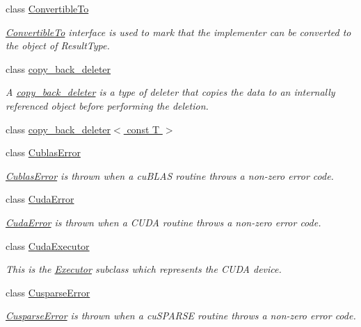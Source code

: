 \begin{DoxyCompactItemize}
class \hyperlink{classgko_1_1ConvertibleTo}{Convertible\+To}
\begin{DoxyCompactList}\small\item\em \hyperlink{classgko_1_1ConvertibleTo}{Convertible\+To} interface is used to mark that the implementer can be converted to the object of Result\+Type. \end{DoxyCompactList}\item 
class \hyperlink{classgko_1_1copy__back__deleter}{copy\+\_\+back\+\_\+deleter}
\begin{DoxyCompactList}\small\item\em A \hyperlink{classgko_1_1copy__back__deleter}{copy\+\_\+back\+\_\+deleter} is a type of deleter that copies the data to an internally referenced object before performing the deletion. \end{DoxyCompactList}\item 
class \hyperlink{classgko_1_1copy__back__deleter_3_01const_01T_01_4}{copy\+\_\+back\+\_\+deleter$<$ const T $>$}
\item 
class \hyperlink{classgko_1_1CublasError}{Cublas\+Error}
\begin{DoxyCompactList}\small\item\em \hyperlink{classgko_1_1CublasError}{Cublas\+Error} is thrown when a cu\+B\+L\+AS routine throws a non-\/zero error code. \end{DoxyCompactList}\item 
class \hyperlink{classgko_1_1CudaError}{Cuda\+Error}
\begin{DoxyCompactList}\small\item\em \hyperlink{classgko_1_1CudaError}{Cuda\+Error} is thrown when a C\+U\+DA routine throws a non-\/zero error code. \end{DoxyCompactList}\item 
class \hyperlink{classgko_1_1CudaExecutor}{Cuda\+Executor}
\begin{DoxyCompactList}\small\item\em This is the \hyperlink{classgko_1_1Executor}{Executor} subclass which represents the C\+U\+DA device. \end{DoxyCompactList}\item 
class \hyperlink{classgko_1_1CusparseError}{Cusparse\+Error}
\begin{DoxyCompactList}\small\item\em \hyperlink{classgko_1_1CusparseError}{Cusparse\+Error} is thrown when a cu\+S\+P\+A\+R\+SE routine throws a non-\/zero error code. \end{DoxyCompactList}\item 

\end{DoxyCompactItemize}

